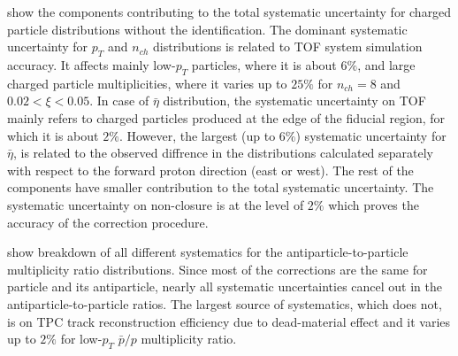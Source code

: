  show the components contributing to the total systematic uncertainty for charged particle distributions without the identification. The dominant systematic uncertainty for $p_T$ and $n_{ch}$ distributions is related to TOF system simulation accuracy. It affects mainly low-$p_T$ particles, where it is about $6\%$, and large charged particle multiplicities, where it varies up to $25\%$ for $n_{ch}=8$ and $0.02 < \xi < 0.05$. In case of $\bar{\eta}$ distribution, the systematic uncertainty on TOF mainly refers to charged particles produced at the edge of the fiducial region, for which it is about $2\%$.  However, the largest (up to $6\%$) systematic uncertainty for $\bar{\eta}$,  is related to the observed diffrence  in the distributions calculated separately with respect to the forward proton direction (east or west). The rest of the components have smaller contribution to the total systematic uncertainty. The systematic uncertainty on non-closure is at the level of $2\%$ which proves  the accuracy of the correction procedure. 

 show breakdown of all different systematics for the antiparticle-to-particle multiplicity ratio distributions. Since most of the corrections are the same for particle and its antiparticle, nearly all systematic uncertainties cancel out in the antiparticle-to-particle ratios. The largest source of systematics, which  does not, is on TPC track reconstruction efficiency due to dead-material effect  and it varies up to $2\%$ for low-$p_T$ $\bar{p}/p$ multiplicity ratio.

